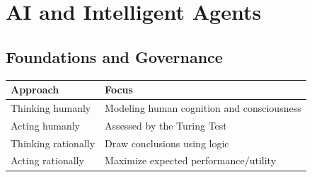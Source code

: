 \documentclass{report}
\begin{document}


\newpage

\newpage
{\hypersetup{linkcolor=mytoccolor}
	\tableofcontents
}
\clearpage
\pagestyle{fancy}

\titlespacing*{\chapter}{0pt}{-25pt}{14pt}
\providecommand{\assignment}[1]{\par\noindent\textbf{Connection to your assignment.} #1}

\chapter{AI and Intelligent Agents}
\section{Foundations and Governance}
\begin{center}
\begin{tabularx}{\textwidth}{@{}l>{\raggedright\arraybackslash}X@{}}
\toprule
Approach & Focus\\\midrule
Thinking humanly & Modeling human cognition and consciousness\\
Acting humanly & Assessed by the Turing Test\\
Thinking rationally & Draw conclusions using logic\\
Acting rationally & Maximize expected performance/utility\\\bottomrule
\end{tabularx}
\end{center}
\end{document}
